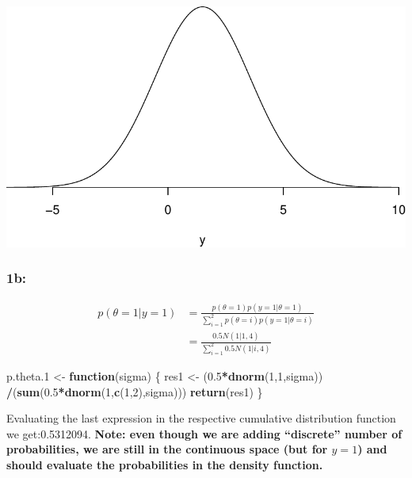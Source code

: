 \documentclass[]{article}
\newenvironment{Shaded}{\begin{snugshade}}{\end{snugshade}}
\newcommand{\KeywordTok}[1]{\textcolor[rgb]{0.13,0.29,0.53}{\textbf{#1}}}
\newcommand{\DecValTok}[1]{\textcolor[rgb]{0.00,0.00,0.81}{#1}}
\newcommand{\FloatTok}[1]{\textcolor[rgb]{0.00,0.00,0.81}{#1}}
\newcommand{\StringTok}[1]{\textcolor[rgb]{0.31,0.60,0.02}{#1}}
\newcommand{\ControlFlowTok}[1]{\textcolor[rgb]{0.13,0.29,0.53}{\textbf{#1}}}
\newcommand{\OperatorTok}[1]{\textcolor[rgb]{0.81,0.36,0.00}{\textbf{#1}}}
\newcommand{\NormalTok}[1]{#1}
\begin{document}
\includegraphics{Untitled_files/figure-latex/unnamed-chunk-1-1.pdf}

\subsubsection{1b:}\label{b}

\[
\begin{aligned}
p(\theta = 1 | y = 1 ) &= \frac{p(\theta = 1)p(y = 1| \theta = 1)}{\sum_{i=1}^{2}p(\theta = i)p(y = 1| \theta = i)} \nonumber \\
                      &= \frac{0.5N(1|1,4)}{\sum_{i=1}^{2}0.5N(1|i,4)}
\end{aligned}
\]

\begin{Shaded}
\begin{Highlighting}[]
\NormalTok{p.theta.}\DecValTok{1}\NormalTok{       <-}\StringTok{ }\ControlFlowTok{function}\NormalTok{(sigma) \{}
\NormalTok{  res1          <-}\StringTok{ }\NormalTok{(}\FloatTok{0.5}\OperatorTok{*}\KeywordTok{dnorm}\NormalTok{(}\DecValTok{1}\NormalTok{,}\DecValTok{1}\NormalTok{,sigma)) }\OperatorTok{/}\NormalTok{(}\KeywordTok{sum}\NormalTok{(}\FloatTok{0.5}\OperatorTok{*}\KeywordTok{dnorm}\NormalTok{(}\DecValTok{1}\NormalTok{,}\KeywordTok{c}\NormalTok{(}\DecValTok{1}\NormalTok{,}\DecValTok{2}\NormalTok{),sigma)))}
  \KeywordTok{return}\NormalTok{(res1)}
\NormalTok{  \}}
\end{Highlighting}
\end{Shaded}

Evaluating the last expression in the respective cumulative distribution
function we get:0.5312094. \textbf{Note: even though we are adding
``discrete'' number of probabilities, we are still in the continuous
space (but for \(y=1\)) and should evaluate the probabilities in the
density function.}
\end{document}
